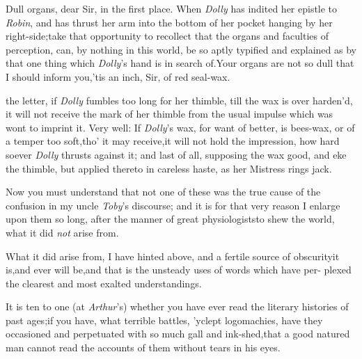 \documentclass{article}
\begin{document}
Dull organs, dear Sir, in the first place. 
When \textit{Dolly} has indited her epistle to \textit{Robin},
and has thrust her arm into the bottom of her pocket hanging by
her\break
right-side;\tsk take that opportunity to recollect that the
organs and faculties of perception, can, by nothing in this
world, be so aptly typified and explained as by that one thing
which \textit{Dolly}’s hand is in search of.\tsk Your organs are
not so dull that I should inform you,\tsk ’tis an inch, Sir, of
red seal-wax.

 the letter, if \textit{Dolly}
fumbles too long for her thimble, till the wax is over harden’d, it
will not receive the mark of her thimble from the usual impulse
which was wont to imprint it. Very well: If \textit{Dolly}’s
wax, for want of better, is bees-wax, or of a temper too
soft,\tsk tho’ it may receive,\tsk it will not hold the
impression, how hard soever \textit{Dolly} thrusts against it; and
last of all, supposing the wax good, and eke the thimble, but
applied thereto in careless haste, as her Mistress rings\break 
{}
jack.

Now you must understand that not one of these was the true cause
of the confusion in my uncle \textit{Toby}’s discourse; and it
is for that very reason I enlarge upon them so long, after the
manner of great physiologists\tsk to shew the world, what it did
\textit{not} arise from.

What it did arise from, I have hinted above, and a fertile
source of obscurity\break it is,\tsk and ever will be,\tsk and that
is the unsteady uses of words which have per- plexed the clearest
and most exalted understandings.

It is ten to one (at \textit{Arthur}’s) whether you have
ever read the literary histories of past ages;\tsk if you
have,\tsk
what terrible battles, ’yclept logomachies, have they
occasioned and perpetuated with so much gall and
ink-shed,\tsk that a good natured man cannot read the accounts\break
of them without tears in his eyes.
\end{document}
